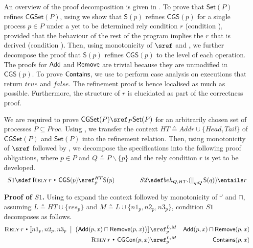 \documentclass{article}
\makeatletter
\newcommand{\st}{~{\scriptscriptstyle ^\bullet}~}
\def \rely {\mathop{\textsc{Rely}}}
\theoremstyle{plain}
\newcounter{thm}
\theoremstyle{definition}
\def \llb {\llbracket}
\def \rrb {\rrbracket}
\newcommand{\Context}[2]
{\!\llb #1 
    \begin{array}[c]{@{~~}|@{~~}l@{}}
      #2
    \end{array}\rrb } \newcommand{\Var}[2]{\textsc{Var}~#1 \st #2}
\newcommand{\Rely}[2]
{\rely #1 \st
    \begin{array}[c]{@{}l@{}}
      #2
    \end{array}}
\newcommand{\Par}{\textstyle\mathop{\|}}
\def \bs {\backslash}
\makeatother
\begin{document}
An overview of the proof decomposition is given in
. 
To prove that $\mathsf{Set}(P)$ refines $\mathsf{CGSet}(P)$, using
 we show that $\mathsf{S}(p)$ refines
$\mathsf{CGS}(p)$ for a single process $p \in P$ under a yet to be
determined rely condition $r$ (condition ), provided that
the behaviour of the rest of the program implies the $r$ that is
derived (condition ). Then, using monotonicity of $\sref$
and , we further decompose the proof that
$\mathsf{S}(p)$ refines $\mathsf{CGS}(p)$ to the level of each
operation. The proofs for ${\sf Add}$ and ${\sf Remove}$ are trivial
because they are unmodified in $\mathsf{CGS}(p)$. To prove ${\sf
  Contains}$, we use  to perform case analysis on
executions that return $true$ and $false$. The refinement proof is
hence localised as much as possible.  Furthermore, the structure of
$r$ is elucidated as part of the correctness proof.








We are required to prove $\mathsf{CGSet}(P) \sref_P \mathsf{Set}(P)$
for an arbitrarily chosen set of processes $P \subseteq Proc$. Using
, we transfer the context $HT \sdef Addr \cup
\{Head, Tail\}$ of $\mathsf{CGSet}(P)$ and $\mathsf{Set}(P)$ into the
refinement relation. Then, using monotonicity of $\sref$ followed by
, we decompose the specifications into the
following proof obligations, where $p \in P$ and $Q \sdef P \bs \{p\}$
and the rely condition $r$ is yet to be developed.
$$\begin{array}[t]{rcl}
  S1 \sdef \Rely{r}{\mathsf{CGS}(p)}  \sref_{p}^{HT} \mathsf{S}(p) & \quad 
  \quad & 
  S2 \sdef beh_{Q,HT}.(\Par_{q : Q} \mathsf{S}(q))  \entails  r
\end{array}$$

\noindent \textbf{Proof of $S1$.}
Using  to expand the context followed by
monotonicity of ${}^\omega$ and $\sqcap$, assuming $L \sdef HT \cup
\{res_p\}$ and $M \sdef L \cup \{n1_p, n2_p, n3_p\}$, condition $S1$
decomposes as follows.
\begin{eqnarray}
  \label{eq:3}
  \Rely{r}{\Context{n1_p, n2_p, n3_p}{\left(
      \begin{array}[c]{@{}l@{}}
        \mathsf{Add}(p, x) {} \sqcap {} 
       \mathsf{Remove}(p,x)
    \end{array}
  \right)}}
& \sref_{p}^{L,M} &
  \begin{array}[c]{@{}l@{}}
    \mathsf{Add}(p,x) 
    {} \sqcap {}  \mathsf{Remove}(p,x)
  \end{array}
  \\
  \label{eq:7}
  \Rely{r}{\mathsf{CGCon}(p, x)} & \sref_{p}^{L,M} & \mathsf{Contains}(p,x) 
\end{eqnarray}  
\end{document}
